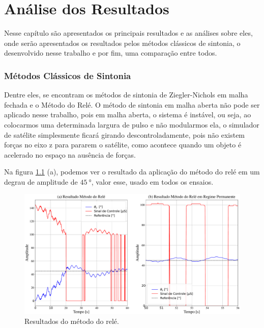 \chapter{Análise dos Resultados}

Nesse capítulo são apresentados os principais resultados e as análises sobre eles, onde serão apresentados os resultados pelos métodos clássicos de sintonia, o desenvolvido nesse trabalho e por fim, uma comparação entre todos.


\subsection{Métodos Clássicos de Sintonia}

Dentre eles, se encontram os métodos de sintonia de Ziegler-Nichols em malha fechada e o Método do Relé. O método de sintonia em malha aberta não pode ser aplicado nesse trabalho, pois em malha aberta, o sistema é instável, ou seja, ao colocarmos uma determinada largura de pulso e não modularmos ela, o simulador de satélite simplesmente ficará girando descontroladamente, pois não existem forças no eixo z para pararem o satélite, como acontece quando um objeto é acelerado no espaço na ausência de forças. 

Na figura \ref{fig:relay} (a), podemos ver o resultado da aplicação do método do relé em um degrau de amplitude de $\SI{45}{\degree}$, valor esse, usado em todos os ensaios.

\begin{figure}[H]
  \caption{Resultados do método do relé.}
  \begin{center}
      \includegraphics[scale=0.35]{resultados/img/relay}
  \end{center}
  \label{fig:relay}
\end{figure}
 
